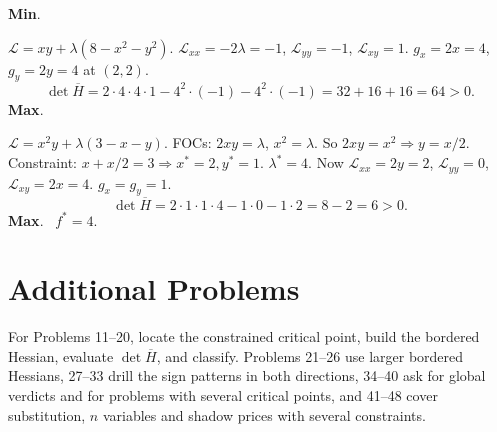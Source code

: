 \begin{solutions}
        \textbf{Min}. \checkmark
  \item $\mathcal{L} = x y + \lambda(8 - x^2 - y^2)$.
        $\mathcal{L}_{xx} = -2 \lambda = -1$, $\mathcal{L}_{yy} = -1$,
        $\mathcal{L}_{xy} = 1$. $g_x = 2 x = 4$, $g_y = 2 y = 4$ at
        $(2, 2)$.
        \[\det \overline{H} = 2 \cdot 4 \cdot 4 \cdot 1
        - 4^2 \cdot (-1) - 4^2 \cdot (-1) = 32 + 16 + 16 = 64 > 0.\]
        \textbf{Max}. \checkmark
  \item $\mathcal{L} = x^2 y + \lambda(3 - x - y)$. FOCs:
        $2 x y = \lambda$, $x^2 = \lambda$. So
        $2 x y = x^2 \Rightarrow y = x/2$. Constraint:
        $x + x/2 = 3 \Rightarrow x^* = 2, y^* = 1$. $\lambda^* = 4$. Now
        $\mathcal{L}_{xx} = 2 y = 2$, $\mathcal{L}_{yy} = 0$,
        $\mathcal{L}_{xy} = 2 x = 4$. $g_x = g_y = 1$.
        \[\det \overline{H} = 2 \cdot 1 \cdot 1 \cdot 4 - 1 \cdot 0
        - 1 \cdot 2 = 8 - 2 = 6 > 0.\] \textbf{Max}. \checkmark\
        $f^* = 4$.
\end{solutions}

\section{Additional Problems}

For Problems 11--20, locate the constrained critical point, build the
bordered Hessian, evaluate $\det \overline{H}$, and classify. Problems 21--26
use larger bordered Hessians, 27--33 drill the sign patterns in both
directions, 34--40 ask for global verdicts and for problems with several
critical points, and 41--48 cover substitution, $n$ variables and shadow
prices with several constraints.

